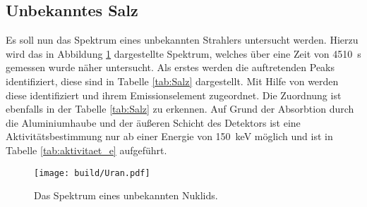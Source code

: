 \subsection{Unbekanntes Salz}
\label{sec:Salz}
Es soll nun das Spektrum eines unbekannten Strahlers untersucht werden. Hierzu wird das in Abbildung \ref{fig:Salz}
dargestellte Spektrum, welches über eine Zeit von \SI{4510}{\second} gemessen wurde näher untersucht.
Als erstes werden die auftretenden Peaks identifiziert, diese sind in Tabelle \ref{tab:Salz} dargestellt.
Mit Hilfe von \cite{referenz1} werden diese identifiziert und ihrem Emissionselement zugeordnet. Die Zuordnung ist
ebenfalls in der Tabelle \ref{tab:Salz} zu erkennen.
Auf Grund der Absorbtion durch die Aluminiumhaube und der äußeren Schicht des Detektors ist eine Aktivitätsbestimmung
nur ab einer Energie von \SI{150}{\kilo\electronvolt} möglich und ist in Tabelle \ref{tab:aktivitaet_e} aufgeführt.

\begin{figure}[htb]
 \centering
 \texttt{[image: build/Uran.pdf]}
 \caption{Das Spektrum eines unbekannten Nuklids.}
 \label{fig:Salz}
\end{figure}


